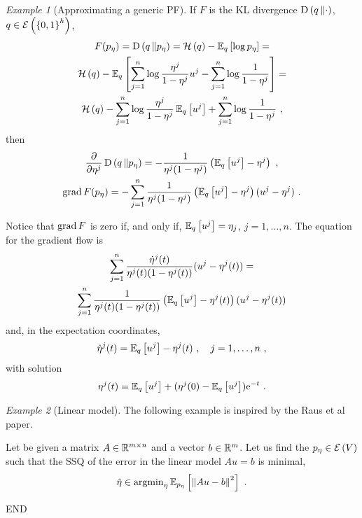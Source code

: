 \documentclass[12pt,a4paper]{amsart}
\theoremstyle{remark}
\newtheorem{example}{Example}
\begin{document}
\begin{example}[Approximating a generic PF]  If $F$ is the KL divergence $\operatorname{D}\left(q\,\Vert\cdot\right)$, $q \in \operatorname{\mathcal E}\left(\left\{0,1\right\}^h\right)$,
\begin{multline}
  \label{eq:59}
  F(p_\eta) = \operatorname{D}\left(q\,\Vert p_\eta\right) = \operatorname{\mathcal H}\left(q\right) - \operatorname{\mathbb E}_{q}\left[\log p_\eta\right] = \\ \operatorname{\mathcal H}\left(q\right) - \operatorname{\mathbb E}_{q}\left[\sum_{j=1}^n \log \frac{\eta^j}{1-\eta^j} u^j - \sum_{j=1}^n \log \frac 1 {1 - \eta^j}\right] = \\ \operatorname{\mathcal H}\left(q\right) - \sum_{j=1}^n \log \frac{\eta^j}{1-\eta^j} \operatorname{\mathbb E}_{q}\left[u^j\right]  + \sum_{j=1}^n \log \frac 1 {1 - \eta^j} \ ,
\end{multline}
then
\begin{gather}
  \label{eq:60}
  \frac {\partial} {\partial \eta^j} \operatorname{D}\left(q\,\Vert p_\eta\right) =  - \frac 1 {\eta^j(1-\eta^j)}\left(\operatorname{\mathbb E}_{q}\left[u^j\right] - \eta^j\right) \ , \\
  \label{eq:60b}
  \operatorname{grad} F(p_\eta) = - \sum_{j=1}^n\frac1{\eta^j(1-\eta^j)}\left(\operatorname{\mathbb E}_{q}\left[u^j\right] - \eta^j\right)(u^j - \eta^j) \ .
\end{gather}

Notice that $\operatorname{grad} F$ is zero if, and only if, $\operatorname{\mathbb E}_{q}\left[u^j\right] = \eta_j$, $j = 1,\dots,n$. The equation for the gradient flow is
\begin{multline}
  \label{eq:56}
  \sum_{j=1}^n \frac {\dot\eta^j(t)}{\eta^j(t)(1-\eta^j(t))}(u^j - \eta^j(t)) = \\ 
  \sum_{j=1}^n\frac1{\eta^j(t)(1-\eta^j(t))}\left(\operatorname{\mathbb E}_{q}\left[u^j\right] - \eta^j(t)\right)(u^j - \eta^j(t))
\end{multline}
and, in the expectation coordinates,
\begin{equation}
  \label{eq:57}
\dot\eta^j(t) = \expectat q {u^j} - \eta^j(t) \ , \quad j=1,\dots,n \ ,   
\end{equation}
with solution
\begin{equation}
  \label{eq:63}
  \eta^j(t) = \operatorname{\mathbb E}_{q}\left[u^j\right] + (\eta^j(0) - \operatorname{\mathbb E}_{q}\left[u^j\right]) \mathrm{e}^{-t} \ .
\end{equation}
\end{example}

\begin{example}[Linear model]
  The following example is inspired by the Raus et al paper.

  Let be given a matrix $A \in \mathbb{R}^{m \times n}$ and a vector $b \in \mathbb{R}^m$. Let us find the $p_\eta \in \operatorname{\mathcal E}\left(V\right)$ such that the SSQ of the error in the linear model $Au=b$ is minimal,
  \begin{equation}
    \label{eq:64}
    \hat \eta \in \Argmin_\eta \expectat {p_\eta}{\normof{Au - b}^2} \ .
  \end{equation}
\end{example}

END


% 


\end{document}
